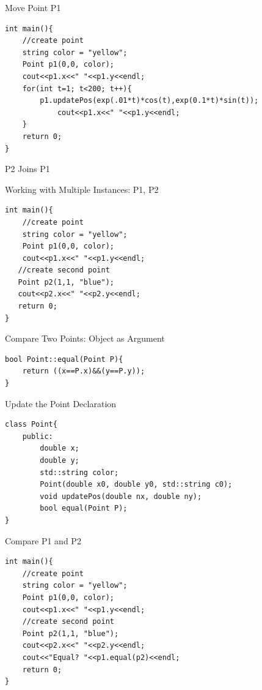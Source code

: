 \documentclass[xcolor={dvipsnames}]{beamer}
\begin{document}
\begin{frame}[fragile]{Move Point P1}
\begin{verbatim}
int main(){
    //create point
    string color = "yellow";
    Point p1(0,0, color);
    cout<<p1.x<<" "<<p1.y<<endl;
    for(int t=1; t<200; t++){
        p1.updatePos(exp(.01*t)*cos(t),exp(0.1*t)*sin(t));
            cout<<p1.x<<" "<<p1.y<<endl;
    }
    return 0;
}
\end{verbatim}
\end{frame}

\begin{frame}{P2 Joins P1}
	\begin{center}
	\end{center}
\end{frame}

\begin{frame}[fragile]{Working with Multiple Instances: P1, P2}
\begin{verbatim}
int main(){
    //create point
    string color = "yellow";
    Point p1(0,0, color);
    cout<<p1.x<<" "<<p1.y<<endl;
   //create second point
   Point p2(1,1, "blue");
   cout<<p2.x<<" "<<p2.y<<endl;
   return 0;
}
\end{verbatim}
\end{frame}

\begin{frame}[fragile]{Compare Two Points: Object as Argument}
\begin{verbatim}
bool Point::equal(Point P){
    return ((x==P.x)&&(y==P.y));
}
\end{verbatim}
\end{frame}

\begin{frame}[fragile]{Update the Point Declaration}
\begin{verbatim}
class Point{
    public:
        double x;
        double y;
        std::string color;
        Point(double x0, double y0, std::string c0);
        void updatePos(double nx, double ny);
        bool equal(Point P);
}
\end{verbatim}
\end{frame}

\begin{frame}[fragile]{Compare P1 and P2}
\begin{verbatim}
int main(){
    //create point
    string color = "yellow";
    Point p1(0,0, color);
    cout<<p1.x<<" "<<p1.y<<endl;
    //create second point
    Point p2(1,1, "blue");
    cout<<p2.x<<" "<<p2.y<<endl;
    cout<<"Equal? "<<p1.equal(p2)<<endl;
    return 0;
}
\end{verbatim}
\end{frame}
\end{document}
